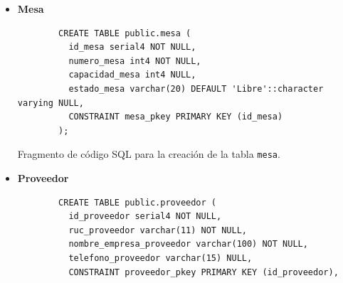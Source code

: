 \begin{itemize}
    \newpage
    \item \textbf{Mesa}
    \begin{listing}[H]
        \centering
        \begin{verbatim}
        CREATE TABLE public.mesa (
          id_mesa serial4 NOT NULL,
          numero_mesa int4 NOT NULL,
          capacidad_mesa int4 NULL,
          estado_mesa varchar(20) DEFAULT 'Libre'::character varying NULL,
          CONSTRAINT mesa_pkey PRIMARY KEY (id_mesa)
        );
        \end{verbatim}
        \caption{Fragmento de código SQL para la creación de la tabla \texttt{mesa}.}
        \label{lst:mesa}
    \end{listing}
    \newpage
    \item \textbf{Proveedor}
    \begin{listing}[H]
        \centering
        \begin{verbatim}
        CREATE TABLE public.proveedor (
          id_proveedor serial4 NOT NULL,
          ruc_proveedor varchar(11) NOT NULL,
          nombre_empresa_proveedor varchar(100) NOT NULL,
          telefono_proveedor varchar(15) NULL,
          CONSTRAINT proveedor_pkey PRIMARY KEY (id_proveedor),

\end{verbatim}
\end{listing}
\end{itemize}
